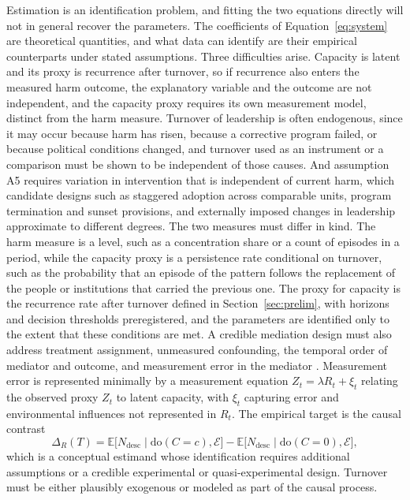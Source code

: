 \documentclass[12pt]{article}
\theoremstyle{remark}
\begin{document}
Estimation is an identification problem, and fitting the two equations directly will not in general recover the parameters. The coefficients of Equation~\eqref{eq:system} are theoretical quantities, and what data can identify are their empirical counterparts under stated assumptions. Three difficulties arise. Capacity is latent and its proxy is recurrence after turnover, so if recurrence also enters the measured harm outcome, the explanatory variable and the outcome are not independent, and the capacity proxy requires its own measurement model, distinct from the harm measure. Turnover of leadership is often endogenous, since it may occur because harm has risen, because a corrective program failed, or because political conditions changed, and turnover used as an instrument or a comparison must be shown to be independent of those causes. And assumption A5 requires variation in intervention that is independent of current harm, which candidate designs such as staggered adoption across comparable units, program termination and sunset provisions, and externally imposed changes in leadership approximate to different degrees. The two measures must differ in kind. The harm measure is a level, such as a concentration share or a count of episodes in a period, while the capacity proxy is a persistence rate conditional on turnover, such as the probability that an episode of the pattern follows the replacement of the people or institutions that carried the previous one. The proxy for capacity is the recurrence rate after turnover defined in Section~\ref{sec:prelim}, with horizons and decision thresholds preregistered, and the parameters are identified only to the extent that these conditions are met. A credible mediation design must also address treatment assignment, unmeasured confounding, the temporal order of mediator and outcome, and measurement error in the mediator \cite{pearl2009}. Measurement error is represented minimally by a measurement equation $Z_t = \lambda R_t + \xi_t$ relating the observed proxy $Z_t$ to latent capacity, with $\xi_t$ capturing error and environmental influences not represented in $R_t$. The empirical target is the causal contrast
\begin{equation}
\Delta_R(T) = \mathbb{E}\bigl[N_{\mathrm{desc}} \mid \mathrm{do}(C=c), \mathcal{E}\bigr] - \mathbb{E}\bigl[N_{\mathrm{desc}} \mid \mathrm{do}(C=0), \mathcal{E}\bigr],
\end{equation}
which is a conceptual estimand whose identification requires additional assumptions or a credible experimental or quasi-experimental design. Turnover must be either plausibly exogenous or modeled as part of the causal process.
\end{document}
